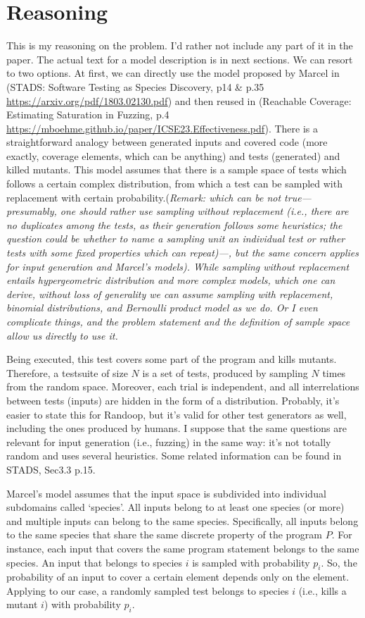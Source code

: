 \documentclass[conference]{IEEEtran}
\begin{document}
\section{Reasoning}
This is my reasoning on the problem. I'd rather not include any part of it in the paper. The actual text for a model description is in next sections.
We can resort to two options.
At first, we can directly use the model proposed by Marcel in (STADS: Software Testing as Species Discovery, p14 \& p.35 \url{https://arxiv.org/pdf/1803.02130.pdf}) and then reused in (Reachable Coverage: Estimating Saturation in Fuzzing, p.4 \url{https://mboehme.github.io/paper/ICSE23.Effectiveness.pdf}).
There is a straightforward analogy between generated inputs and covered code (more exactly, coverage elements, which can be anything) and tests (generated) and killed mutants.
This model assumes that there is a sample space of tests which follows a certain complex distribution, from which a test can be sampled with replacement with certain probability.(\textit{Remark: which can be not
true---presumably, one should rather use sampling without replacement (i.e., there are no duplicates among the tests, as their generation follows some heuristics; the question could be whether to name a sampling unit an individual test or rather tests with some fixed properties which can repeat)---, but the same concern applies for input generation and Marcel's models). While sampling without replacement entails hypergeometric distribution and more complex models, which one can derive, without loss of generality we can assume sampling with replacement, binomial distributions, and Bernoulli product model as we do. Or I even complicate things, and the problem statement and the definition of sample space allow us directly to use it.}

Being executed, this test covers some part of the program and kills mutants. Therefore, a testsuite of size $N$ is a set of tests, produced by sampling $N$ times from the random space.
Moreover, each trial is independent, and all interrelations between tests (inputs) are hidden in the form of a distribution. Probably, it's easier to state this for Randoop, but it's valid for other test generators as well, including the ones produced by humans. I suppose that the same questions are relevant for input generation (i.e., fuzzing) in the same way: it's not totally random and uses several heuristics. Some related information can be found in STADS, Sec3.3 p.15.

Marcel's model assumes that the input space is subdivided into individual subdomains called `species'. All inputs belong to at least one species (or more) and multiple inputs can belong to the same species. Specifically, all inputs belong to the same species that share the same discrete property of the program $P$. For instance, each input that covers the same program statement belongs to the same species.
An input that belongs to species $i$ is sampled with probability $p_i$.
So, the probability of an input to cover a certain element depends only on the element.
Applying to our case, a randomly sampled test belongs to species $i$ (i.e., kills a mutant $i$) with probability $p_i$.
\end{document}
